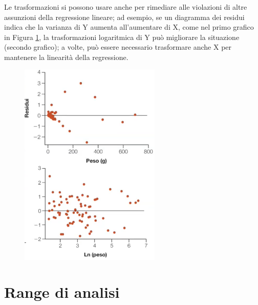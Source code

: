 \documentclass[10pt, draft]{book}
\begin{document}
Le trasformazioni si possono usare anche per rimediare alle violazioni di altre assunzioni della regressione lineare; ad esempio, se un diagramma dei residui indica che la varianza di Y aumenta all'aumentare di X, come nel primo grafico in Figura \ref{fig17.6-3}, la trasformazioni logaritmica di Y può migliorare la situazione (secondo grafico); a volte, può essere necessario trasformare anche X per mantenere la  linearità della regressione.\\
\begin{figure}[H]
    \centering
    \includegraphics[width=0.6\textwidth]{fig17.6-3}
    \caption{\small{}}
    \label{fig17.6-3}
\end{figure}

\section{Range di analisi}
\end{document}

